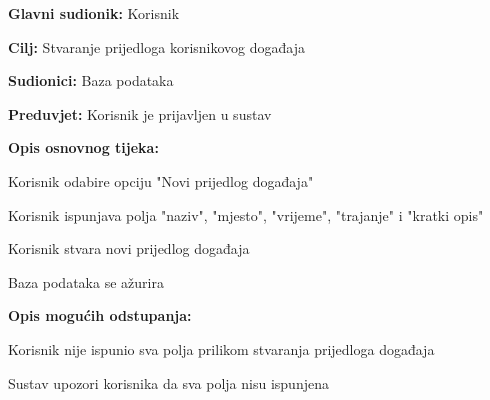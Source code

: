					\begin{packed_item}
	
						\item \textbf{Glavni sudionik: }Korisnik
						\item  \textbf{Cilj:} Stvaranje prijedloga korisnikovog događaja
						\item  \textbf{Sudionici:} Baza podataka
						\item  \textbf{Preduvjet:} Korisnik je prijavljen u sustav
						\item  \textbf{Opis osnovnog tijeka:}
						
						\item[] \begin{packed_enum}
	
							\item Korisnik odabire opciju "Novi prijedlog događaja" 
							\item Korisnik ispunjava polja "naziv", "mjesto", "vrijeme", "trajanje" i "kratki opis"
							\item Korisnik stvara novi prijedlog događaja
							\item Baza podataka se ažurira
						\end{packed_enum}
						
						\item  \textbf{Opis mogućih odstupanja:}
						
						\item[] \begin{packed_item}
	
							\item[2.a] Korisnik nije ispunio sva polja prilikom stvaranja prijedloga događaja
							\item[] \begin{packed_enum}
								
								\item Sustav upozori korisnika da sva polja nisu ispunjena
								
							\end{packed_enum}
							
							
						\end{packed_item}
					\end{packed_item}						
					\noindent {}

